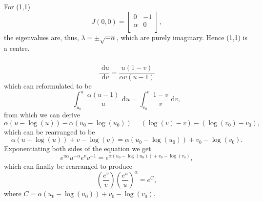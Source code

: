 \documentclass[]{article}
\newcommand{\bb}{\begin{equation}}
\newcommand{\ee}{\end{equation}}
\newcommand{\rd}{\text{ d}}
\renewcommand{\l}{\left(}
\renewcommand{\r}{\right)}
\begin{document}
\begin{Answ}
For (1,1)
\bb
J(0,0)=\left[ {\begin{array}{cc}
   0 & -1 \\
   \alpha & 0 \\
  \end{array} } \right],
\ee
the eigenvalues are, thus, $\lambda=\pm\sqrt{-\alpha}$, which are purely imaginary. Hence (1,1) is a centre.
\subsubsection{}
\bb
\frac{\rd u}{\rd v}=\frac{u\l 1-v\r}{\alpha v\l u-1\r}
\ee
which can reformulated to be
\bb
\int^u_{u_0}\frac{\alpha(u-1)}{u}\rd u=\int^v_{v_0}\frac{1-v}{v}\rd v,
\ee
from which we can derive
\bb
\alpha(u-\log(u))-\alpha(u_0-\log(u_0))=(\log(v)-v)-(\log(v_0)-v_0),
\ee
which can be rearranged to be
\bb
\alpha(u-\log(u))+v-\log(v)=\alpha(u_0-\log(u_0))+v_0-\log(v_0).
\ee
Exponentiating both sides of the equation we get
\bb
e^{u\alpha}u^{-\alpha}e^{v}v^{-1}=e^{\alpha(u_0-\log(u_0))+v_0-\log(v_0)},
\ee
which can finally be rearranged to produce
\bb
\l\frac{e^{v}}{v}\r\l\frac{e^{u}}{u}\r^\alpha=e^{C},\label{Conserved}
\ee
where $C=\alpha(u_0-\log(u_0))+v_0-\log(v_0)$.
\end{Answ}
\end{document}
